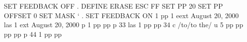 SET FEEDBACK OFF                                                                
.                                                                               
DEFINE ERASE ESC FF                                                             
SET PP 20                                                                       
SET PP OFFSET 0                                                                 
SET MASK `                                                                      
.                                                                               
SET FEEDBACK ON                                                                 
1                                                                               
pp                                                                              
1                                                                               
eext  August 20, 2000                                                           
las                                                                             
1                                                                               
ext  August 20, 2000                                                            
p                                                                               
1                                                                               
pp                                                                              
pp                                                                              
p 33                                                                            
las                                                                             
1                                                                               
pp                                                                              
pp                                                                              
34                                                                              
c /to/to the/                                                                   
u 5                                                                             
pp                                                                              
pp                                                                              
pp                                                                              
pp                                                                              
p 44                                                                            
1                                                                               
pp                                                                              
pp                                                                              
                                                                                
